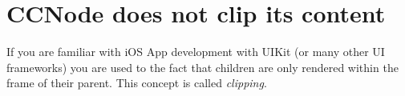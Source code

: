 \section{CCNode does not clip its content}
If you are familiar with iOS App development with UIKit (or many other UI
frameworks) you are used to the fact that children are only rendered within the
frame of their parent. This concept is called \textit{clipping}.
